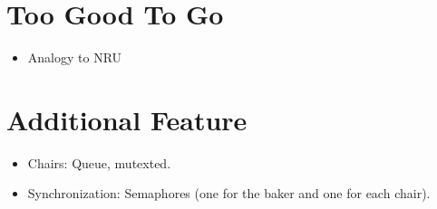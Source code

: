 \documentclass[11pt]{article}
\begin{document}
\section{Too Good To Go}
\label{sec:org77d5be8}
\begin{itemize}
\item Analogy to NRU\\
\end{itemize}

\section{Additional Feature}
\label{sec:org289e06e}
\begin{itemize}
\item Chairs: Queue, mutexted.\\
\item Synchronization: Semaphores (one for the baker and one for each chair).\\
\end{itemize}
\end{document}
